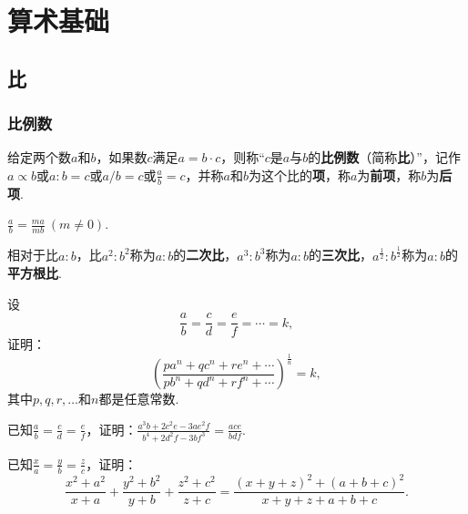 \chapter{算术基础}

\section{比}
\subsection{比例数}
\begin{definition}
给定两个数\(a\)和\(b\)，如果数\(c\)满足\(a=b \cdot c\)，则称“\(c\)是\(a\)与\(b\)的\textbf{比例数}（简称\textbf{比}）”，记作\(a \propto b\)或\(a:b=c\)或\(a/b=c\)或\(\frac{a}{b}=c\)，并称\(a\)和\(b\)为这个比的\textbf{项}，称\(a\)为\textbf{前项}，称\(b\)为\textbf{后项}.
\end{definition}

\begin{property}
\(\frac{a}{b} = \frac{ma}{mb}\ (m\neq0)\).
\end{property}

\begin{definition}
相对于比\(a:b\)，比\(a^2:b^2\)称为\(a:b\)的\textbf{二次比}，\(a^3:b^3\)称为\(a:b\)的\textbf{三次比}，\(a^{\frac{1}{2}}:b^{\frac{1}{2}}\)称为\(a:b\)的\textbf{平方根比}.
\end{definition}

\begin{example}
设\[
\frac{a}{b} = \frac{c}{d} = \frac{e}{f} = \dotsb = k,
\]证明：\[
\left(\frac{p a^n + q c^n + r e^n + \dotsb}{p b^n + q d^n + r f^n + \dotsb}\right)^{\frac{1}{n}} = k,
\]其中\(p,q,r,\dotsc\)和\(n\)都是任意常数.
\end{example}

\begin{example}
已知\(\frac{a}{b}=\frac{c}{d}=\frac{e}{f}\)，证明：\(\frac{a^3b+2c^2e-3ae^2f}{b^4+2d^2f-3bf^3} = \frac{ace}{bdf}\).
\end{example}

\begin{example}
已知\(\frac{x}{a}=\frac{y}{b}=\frac{z}{c}\)，证明：\[
\frac{x^2+a^2}{x+a}+\frac{y^2+b^2}{y+b}+\frac{z^2+c^2}{z+c}
= \frac{(x+y+z)^2+(a+b+c)^2}{x+y+z+a+b+c}.
\]
\end{example}

